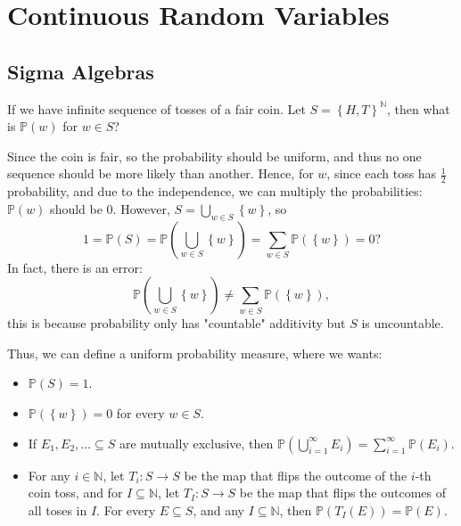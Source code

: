 \chapter{Continuous Random Variables}
\section{Sigma Algebras}
\begin{eg}
    If we have infinite sequence of tosses of a fair coin. Let \(S = \left\{ H, T \right\}^{\mathbb{N}} \), then what is \(\mathbb{P} (w)\) for \(w \in S\)?   
\end{eg}
\begin{explanation}
    Since the coin is fair, so the probability should be uniform, and thus no one sequence should be more likely than another. Hence, for \(w\), since each toss has \(\frac{1}{2}\) probability, and due to the independence, we can multiply the probabilities: \(\mathbb{P} (w)\) should be \(0\). However, \(S = \bigcup_{w \in S} \left\{ w \right\}  \), so 
    \[
        1 = \mathbb{P} (S) = \mathbb{P} \left( \bigcup_{w \in S} \left\{ w \right\}   \right) = \sum_{w \in S} \mathbb{P} \left( \left\{ w \right\}  \right) = 0 ?   
    \]    
    In fact, there is an error:
    \[
        \mathbb{P} \left( \bigcup_{w \in S} \left\{ w \right\}   \right) \neq \sum_{w \in S} \mathbb{P} (\left\{ w \right\} ),  
    \]
    this is because probability only has "countable" additivity but \(S\) is uncountable. 
\end{explanation}

Thus, we can define a uniform probability measure, where we wants:
\begin{itemize}
    \item [(1)] \(\mathbb{P} (S) = 1\). 
    \item [(2)] \(\mathbb{P} (\left\{ w \right\} ) = 0\) for every \(w \in S\). 
    \item [(3)] If \(E_1, E_2, \dots \subseteq S\) are mutually exclusive, then \(\mathbb{P} \left( \bigcup_{i=1}^{\infty} E_i  \right) = \sum_{i=1}^{\infty} \mathbb{P} (E_i)  \). 
    \item [(4)] For any \(i \in \mathbb{N} \), let \(T_i : S \to S\) be the map that flips the outcome of the \(i\)-th coin toss, and for \(I \subseteq \mathbb{N}\), let \(T_I: S \to S\) be the map that flips the outcomes of all toses in \(I\). For every \(E \subseteq S\), and any \(I \subseteq \mathbb{N}\), then \(\mathbb{P} (T_I(E))= \mathbb{P} (E)\).              
\end{itemize}

